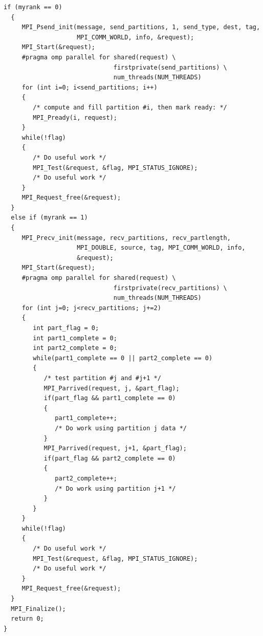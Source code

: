 \begin{example}
\begin{lstlisting}[language={[MPI]C}]
  if (myrank == 0)
  {
     MPI_Psend_init(message, send_partitions, 1, send_type, dest, tag,
                    MPI_COMM_WORLD, info, &request);
     MPI_Start(&request);
     #pragma omp parallel for shared(request) \
                              firstprivate(send_partitions) \
                              num_threads(NUM_THREADS)
     for (int i=0; i<send_partitions; i++)
     {
        /* compute and fill partition #i, then mark ready: */
        MPI_Pready(i, request);
     }
     while(!flag)
     {
        /* Do useful work */
        MPI_Test(&request, &flag, MPI_STATUS_IGNORE);
        /* Do useful work */
     }
     MPI_Request_free(&request);
  }
  else if (myrank == 1)
  {
     MPI_Precv_init(message, recv_partitions, recv_partlength,
                    MPI_DOUBLE, source, tag, MPI_COMM_WORLD, info,
                    &request);
     MPI_Start(&request);
     #pragma omp parallel for shared(request) \
                              firstprivate(recv_partitions) \
                              num_threads(NUM_THREADS)
     for (int j=0; j<recv_partitions; j+=2)
     {
        int part_flag = 0;
        int part1_complete = 0;
        int part2_complete = 0;
        while(part1_complete == 0 || part2_complete == 0)
        {
           /* test partition #j and #j+1 */
           MPI_Parrived(request, j, &part_flag);
           if(part_flag && part1_complete == 0)
           {
              part1_complete++;
              /* Do work using partition j data */
           }
           MPI_Parrived(request, j+1, &part_flag);
           if(part_flag && part2_complete == 0)
           {
              part2_complete++;
              /* Do work using partition j+1 */
           }
        }
     }
     while(!flag)
     {
        /* Do useful work */
        MPI_Test(&request, &flag, MPI_STATUS_IGNORE);
        /* Do useful work */
     }
     MPI_Request_free(&request);
  }
  MPI_Finalize();
  return 0;
}
\end{lstlisting}
\end{example}

